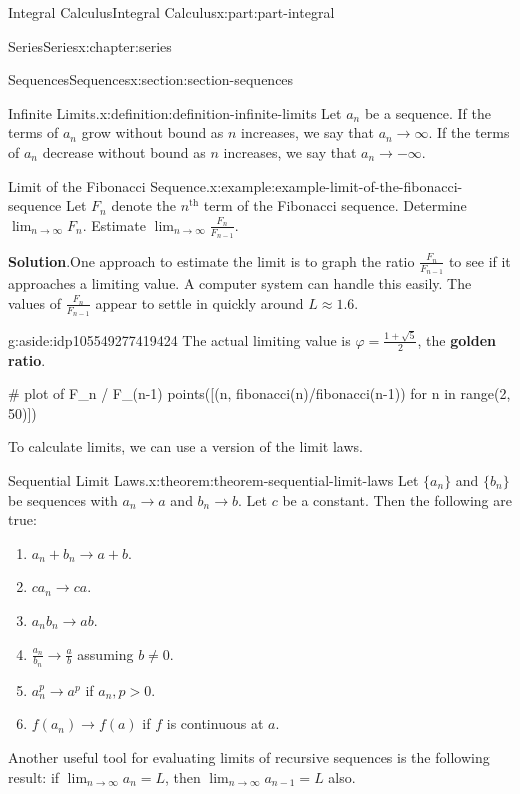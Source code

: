\documentclass[twoside,10pt,]{book}
\newcommand{\blocktitlefont}{\relax}
\newcommand{\terminology}[1]{\textbf{#1}}
\numberwithin{equation}{part}
\newcommand{\gt}{>}
\begin{document}
\begin{partptx}{Integral Calculus}{}{Integral Calculus}{}{}{x:part:part-integral}
\begin{chapterptx}{Series}{}{Series}{}{}{x:chapter:series}
\begin{sectionptx}{Sequences}{}{Sequences}{}{}{x:section:section-sequences}
\begin{definition}{Infinite Limits.}{x:definition:definition-infinite-limits}
Let \(a_{n}\) be a sequence. If the terms of \(a_{n}\) grow without bound as \(n\) increases, we say that \(a_{n}\to\infty\). If the terms of \(a_{n}\) decrease without bound as \(n\) increases, we say that \(a_{n}\to-\infty\).%
\end{definition}
\begin{example}{Limit of the Fibonacci Sequence.}{x:example:example-limit-of-the-fibonacci-sequence}%
Let \(F_{n}\) denote the \(n^{\text{th}}\) term of the Fibonacci sequence. Determine \(\lim_{n\to\infty}F_{n}\). Estimate \(\lim_{n\to\infty}\frac{F_{n}}{F_{n-1}}\).%
\par\smallskip%
\noindent\textbf{\blocktitlefont Solution}.\hypertarget{g:solution:idp105549277417760}{}\quad{}One approach to estimate the limit is to graph the ratio \(\frac{F_n}{F_{n-1}}\) to see if it approaches a limiting value. A computer system can handle this easily. The values of \(\frac{F_n}{F_{n-1}}\) appear to settle in quickly around \(L\approx1.6\). \begin{aside}{}{g:aside:idp105549277419424}%
The actual limiting value is \(\varphi = \frac{1+\sqrt{5}}{2}\), the \terminology{golden ratio}.%
\end{aside}
%
\end{example}
\begin{sageinput}
# plot of F_n / F_(n-1)
points([(n, fibonacci(n)/fibonacci(n-1)) for n in range(2, 50)])
\end{sageinput}
To calculate limits, we can use a version of the limit laws.%
\begin{theorem}{Sequential Limit Laws.}{}{x:theorem:theorem-sequential-limit-laws}%
Let \(\{a_{n}\}\) and \(\{b_{n}\}\) be sequences with \(a_{n}\to a\) and \(b_{n}\to b\). Let \(c\) be a constant. Then the following are true:%
%
\begin{enumerate}
\item{}\(\displaystyle a_{n} + b_{n} \to a + b.\)%
\item{}\(\displaystyle ca_{n}\to ca.\)%
\item{}\(\displaystyle a_{n}b_{n}\to ab.\)%
\item{}\(\frac{a_{n}}{b_{n}}\to\frac{a}{b}\) assuming \(b\neq 0\).%
\item{}\(a_{n}^{p}\to a^{p}\) if \(a_{n},p \gt 0\).%
\item{}\(f(a_{n})\to f(a)\) if \(f\) is continuous at \(a\).%
\end{enumerate}
\end{theorem}
Another useful tool for evaluating limits of recursive sequences is the following result: if \(\lim_{n\to\infty}a_{n} = L\), then \(\lim_{n\to\infty}a_{n-1} = L\) also.%

\end{sectionptx}
\end{chapterptx}
\end{partptx}
\end{document}
